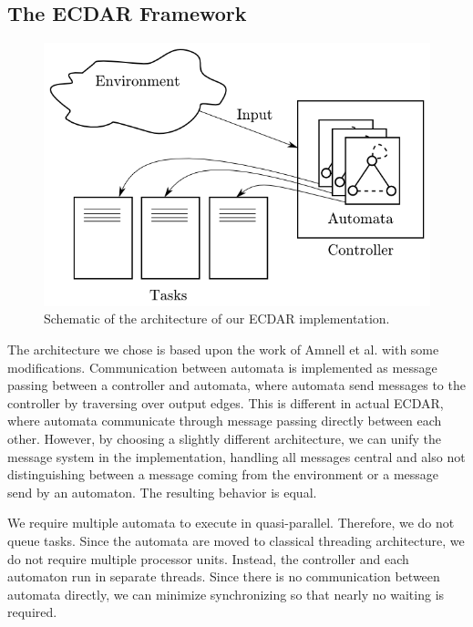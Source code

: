 \subsection{The ECDAR Framework}
\label{implementation-framework}

\begin{figure}[t]
\begin{centering}
\includegraphics[scale=0.5]{images/ecdar_architecture} 
\par\end{centering}

\caption{Schematic of the architecture of our ECDAR implementation.}
\end{figure}

The architecture we chose is based upon the work of Amnell et
al.\cite{amnell_code_2002} with some modifications. Communication between
automata is implemented as message passing between a controller and automata,
where automata send messages to the controller by traversing over output
edges. This is different in actual ECDAR, where automata communicate through
message passing directly between each other. However, by choosing a slightly
different architecture, we can unify the message system in the implementation,
handling all messages central and also not distinguishing between a message
coming from the environment or a message send by an automaton. The resulting
behavior is equal.

We require multiple automata to execute in quasi-parallel. Therefore,
we do not queue tasks. Since the automata are moved to classical threading
architecture, we do not require multiple processor units. Instead,
the controller and each automaton run in separate threads. Since there
is no communication between automata directly, we can minimize synchronizing
so that nearly no waiting is required.

